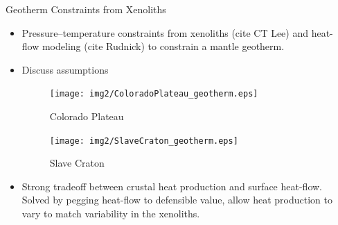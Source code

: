 \documentclass[final]{beamer}
\newlength{\onecolwid}
\newlength{\twocolwid}
\begin{document}
\begin{frame}[t]
\begin{columns}[t]
\begin{column}{\twocolwid}
\begin{columns}[t,totalwidth=\twocolwid] %

\begin{column}{\onecolwid}\vspace{-.6in} %


\begin{block}{Geotherm Constraints from Xenoliths}

\begin{itemize}

\item Pressure--temperature constraints from xenoliths (cite CT Lee) and heat-flow modeling (cite Rudnick) to constrain a mantle geotherm.

\item Discuss assumptions

\begin{figure}
\texttt{[image: img2/ColoradoPlateau\_geotherm.eps]}
\caption{Colorado Plateau}
\end{figure}


\begin{figure}
\texttt{[image: img2/SlaveCraton\_geotherm.eps]}
\caption{Slave Craton}
\end{figure}

\item Strong tradeoff between crustal heat production and surface heat-flow.  Solved by pegging heat-flow to defensible value, allow heat production to vary to match variability in the xenoliths.

\end{itemize}

\end{block}


\end{column} %

\begin{column}{\onecolwid}\vspace{-.6in} %



\end{column}
\end{columns}
\end{column}
\end{columns}
\end{frame}
\end{document}
